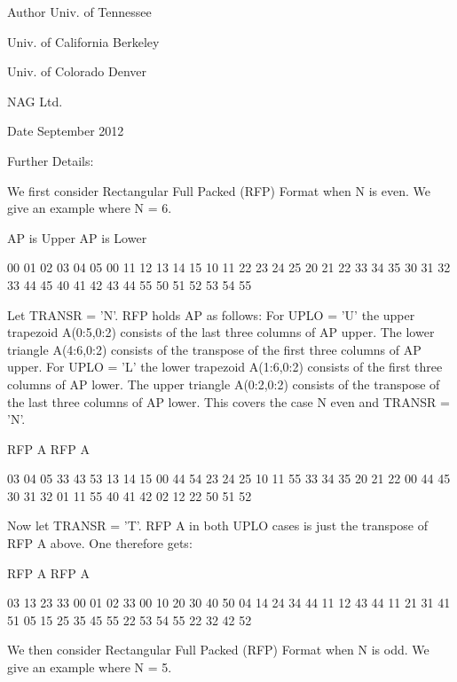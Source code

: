 \begin{DoxyAuthor}{Author}
Univ. of Tennessee 

Univ. of California Berkeley 

Univ. of Colorado Denver 

N\+A\+G Ltd. 
\end{DoxyAuthor}
\begin{DoxyDate}{Date}
September 2012 
\end{DoxyDate}
\begin{DoxyParagraph}{Further Details\+: }
\begin{DoxyVerb}  We first consider Rectangular Full Packed (RFP) Format when N is
  even. We give an example where N = 6.

      AP is Upper             AP is Lower

   00 01 02 03 04 05       00
      11 12 13 14 15       10 11
         22 23 24 25       20 21 22
            33 34 35       30 31 32 33
               44 45       40 41 42 43 44
                  55       50 51 52 53 54 55


  Let TRANSR = 'N'. RFP holds AP as follows:
  For UPLO = 'U' the upper trapezoid A(0:5,0:2) consists of the last
  three columns of AP upper. The lower triangle A(4:6,0:2) consists of
  the transpose of the first three columns of AP upper.
  For UPLO = 'L' the lower trapezoid A(1:6,0:2) consists of the first
  three columns of AP lower. The upper triangle A(0:2,0:2) consists of
  the transpose of the last three columns of AP lower.
  This covers the case N even and TRANSR = 'N'.

         RFP A                   RFP A

        03 04 05                33 43 53
        13 14 15                00 44 54
        23 24 25                10 11 55
        33 34 35                20 21 22
        00 44 45                30 31 32
        01 11 55                40 41 42
        02 12 22                50 51 52

  Now let TRANSR = 'T'. RFP A in both UPLO cases is just the
  transpose of RFP A above. One therefore gets:


           RFP A                   RFP A

     03 13 23 33 00 01 02    33 00 10 20 30 40 50
     04 14 24 34 44 11 12    43 44 11 21 31 41 51
     05 15 25 35 45 55 22    53 54 55 22 32 42 52


  We then consider Rectangular Full Packed (RFP) Format when N is
  odd. We give an example where N = 5.


\end{DoxyVerb}
\end{DoxyParagraph}

